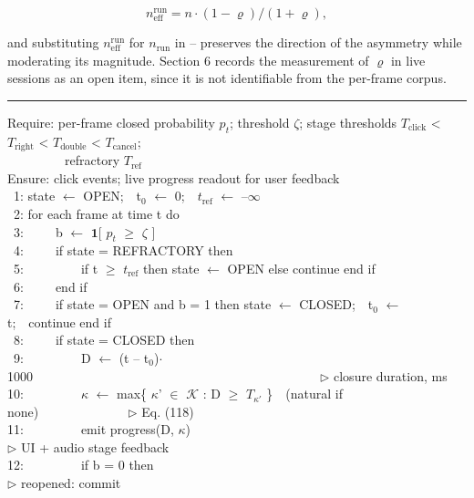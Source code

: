 \begin{equation}
\label{eq:123}
n_{\mathrm{eff}}^{\mathrm{run}} = n \cdot ( 1 - \varrho ) / ( 1 + \varrho ) ,
\end{equation}

and substituting $n_{\mathrm{eff}}^{\mathrm{run}}$ for $n_{\mathrm{run}}$ in -- preserves the direction of the asymmetry while moderating its magnitude. Section 6 records the measurement of $\varrho$ in live sessions as an open item, since it is not identifiable from the per-frame corpus.

\begin{algorithm}[htbp]
\caption{Intentional-blink finite-state machine}
\label{alg:5}
\hrule\vspace{3pt}
{\ttfamily\scriptsize\raggedright
Require: per-frame closed probability $p_{t}$; threshold $\zeta$; stage thresholds $T_{\mathrm{click}}$ < $T_{\mathrm{right}}$ < $T_{\mathrm{double}}$ < $T_{\mathrm{cancel}}$; \\
~~~~~~~~~refractory $T_{\mathrm{ref}}$ \\
Ensure: click events; live progress readout for user feedback \\
~1: state $\leftarrow$ OPEN;~~t$_{0}$ $\leftarrow$ 0;~~$t_{\mathrm{ref}}$ $\leftarrow$ --$\infty$ \\
~2: for each frame at time t do \\
~3:~~~~~b $\leftarrow$ $\mathbf{1}$[ $p_{t}$ $\geq$ $\zeta$ ] \\
~4:~~~~~if state = REFRACTORY then \\
~5:~~~~~~~~~if t $\geq$ $t_{\mathrm{ref}}$ then state $\leftarrow$ OPEN else continue end if \\
~6:~~~~~end if \\
~7:~~~~~if state = OPEN and b = 1 then state $\leftarrow$ CLOSED;~~t$_{0}$ $\leftarrow$ t;~~continue end if \\
~8:~~~~~if state = CLOSED then \\
~9:~~~~~~~~~D $\leftarrow$ (t -- t$_{0}$)$\cdot$1000~~~~~~~~~~~~~~~~~~~~~~~~~~~~~~~~~~~~~~~~~~~~~$\triangleright$ closure duration, ms \\
10:~~~~~~~~~$\kappa$ $\leftarrow$ max\{ $\kappa$' $\in$ $\mathcal{K}$ : D $\geq$ $T_{\kappa '}$ \}~~(natural if none)~~~~~~~~~~~~~~$\triangleright$ Eq. (118) \\
11:~~~~~~~~~emit progress(D, $\kappa$)~~~~~~~~~~~~~~~~~~~~~~~~~~~~~~~~~~~~~~~~~~~$\triangleright$ UI + audio stage feedback \\
12:~~~~~~~~~if b = 0 then~~~~~~~~~~~~~~~~~~~~~~~~~~~~~~~~~~~~~~~~~~~~~~~~~$\triangleright$ reopened: commit \\
}
\end{algorithm}
